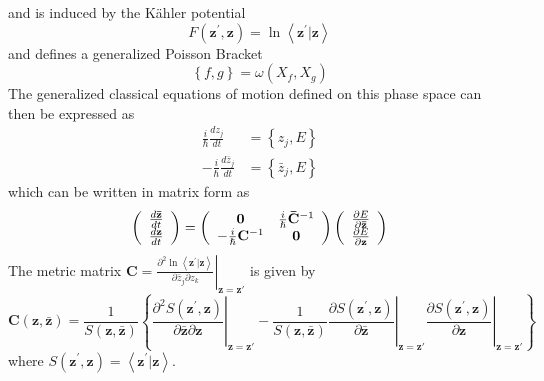 \documentclass[aps,preprint]{revtex4}%
\begin{document}
and is induced by the K\"{a}hler potential
\begin{equation}
F\left(  \mathbf{z}^{\prime},\mathbf{z}\right)  =\ln\left\langle
\mathbf{z}^{\prime}|\mathbf{z}\right\rangle
\end{equation}
and defines a generalized Poisson Bracket%
\begin{equation}
\left\{  f,g\right\}  =\omega\left(  X_{f},X_{g}\right)
\end{equation}
The generalized classical equations of motion defined on this phase space can
then be expressed as
\begin{align}
\frac{i}{\hslash}\frac{dz_{j}}{dt} &  =\left\{  z_{j},E\right\}  \nonumber\\
-\frac{i}{\hslash}\frac{d\bar{z}_{j}}{dt} &  =\left\{  \bar{z}_{j},E\right\}
\label{EOM}%
\end{align}
which can be written in matrix form as
\begin{equation}
\left(
\begin{array}
[c]{c}%
\frac{d\mathbf{\bar{z}}}{dt}\\
\frac{d\mathbf{z}}{dt}%
\end{array}
\right)  =\left(
\begin{array}
[c]{cc}%
\mathbf{0} & \frac{i}{\hslash}\mathbf{\bar{C}}^{-1}\\
-\frac{i}{\hslash}\mathbf{C}^{-1} & \mathbf{0}%
\end{array}
\right)  \left(
\begin{array}
[c]{c}%
\frac{\partial E}{\partial\mathbf{\bar{z}}}\\
\frac{\partial E}{\partial\mathbf{z}}%
\end{array}
\right)
\end{equation}
The metric matrix $\mathbf{C}=\left.  \frac{\partial^{2}\ln\left\langle
\mathbf{z}^{\prime}|\mathbf{z}\right\rangle }{\partial\bar{z}_{j}\partial
z_{k}}\right\vert _{\mathbf{z=z\prime}}$ is given by
\begin{equation}
\mathbf{C}\left(  \mathbf{z},\mathbf{\bar{z}}\right)  =\frac{1}{S\left(
\mathbf{z},\mathbf{\bar{z}}\right)  }\left\{  \left.  \frac{\partial
^{2}S\left(  \mathbf{z}^{\prime},\mathbf{z}\right)  }{\partial\mathbf{\bar{z}%
}\partial\mathbf{z}}\right\vert _{\mathbf{z=z\prime}}-\frac{1}{S\left(
\mathbf{z},\mathbf{\bar{z}}\right)  }\left.  \frac{\partial S\left(
\mathbf{z}^{\prime},\mathbf{z}\right)  }{\partial\mathbf{\bar{z}}}\right\vert
_{\mathbf{z=z\prime}}\left.  \frac{\partial S\left(  \mathbf{z}^{\prime
},\mathbf{z}\right)  }{\partial\mathbf{z}}\right\vert _{\mathbf{z=z\prime}%
}\right\}
\end{equation}
where $S\left(  \mathbf{z}^{\prime},\mathbf{z}\right)  =\left\langle
\mathbf{z}^{\prime}|\mathbf{z}\right\rangle $.
\end{document}
